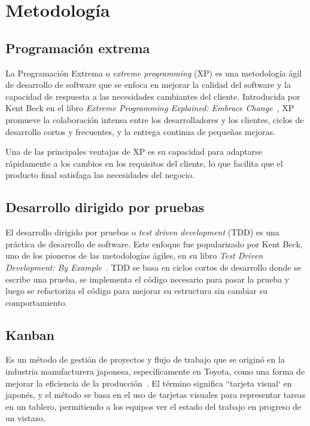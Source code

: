 \chapter{Metodología}\label{ch:chapter_3}


\section{Programación extrema}

La Programación Extrema o \textit{extreme programming} (XP) es una metodología ágil de desarrollo de software que se
enfoca en mejorar la calidad del software y la capacidad de respuesta a las necesidades cambiantes del cliente.
Introducida por Kent Beck en el libro \textit{Extreme Programming Explained: Embrace Change}~\cite{book_beck_1999},
XP promueve la colaboración intensa entre los desarrolladores y los clientes, ciclos de
desarrollo cortos y frecuentes, y la entrega continua de pequeñas mejoras.

Una de las principales ventajas de XP es su capacidad para adaptarse rápidamente a los cambios en los requisitos del
cliente, lo que facilita que el producto final satisfaga las necesidades del negocio.


\section{Desarrollo dirigido por pruebas}

El desarrollo dirigido por pruebas o \textit{test driven development} (TDD) es una práctica de desarrollo de software.
Este enfoque fue popularizado por Kent Beck, uno de los pioneros de las metodologías ágiles, en su libro
\textit{Test Driven Development: By Example}~\cite{book_beck_2003}.
TDD se basa en ciclos cortos de desarrollo donde se escribe una prueba, se implementa el código necesario para pasar la
prueba y luego se refactoriza el código para mejorar su estructura sin cambiar su comportamiento.


\section{Kanban}
Es un método de gestión de proyectos y flujo de trabajo que se originó en la industria manufacturera japonesa,
específicamente en Toyota, como una forma de mejorar la eficiencia de la producción~\cite{book_anderson_2010}.
El término significa ``tarjeta visual` en japonés, y el método se basa en el uso de tarjetas visuales para
representar tareas en un tablero, permitiendo a los equipos ver el estado del trabajo en progreso de un
vistazo.

